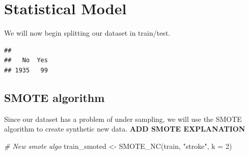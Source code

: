 \documentclass[
]{article}
\newenvironment{Shaded}{\begin{snugshade}}{\end{snugshade}}
\newcommand{\AttributeTok}[1]{\textcolor[rgb]{0.77,0.63,0.00}{#1}}
\newcommand{\CommentTok}[1]{\textcolor[rgb]{0.56,0.35,0.01}{\textit{#1}}}
\newcommand{\DecValTok}[1]{\textcolor[rgb]{0.00,0.00,0.81}{#1}}
\newcommand{\FloatTok}[1]{\textcolor[rgb]{0.00,0.00,0.81}{#1}}
\newcommand{\FunctionTok}[1]{\textcolor[rgb]{0.00,0.00,0.00}{#1}}
\newcommand{\NormalTok}[1]{#1}
\newcommand{\OtherTok}[1]{\textcolor[rgb]{0.56,0.35,0.01}{#1}}
\newcommand{\SpecialCharTok}[1]{\textcolor[rgb]{0.00,0.00,0.00}{#1}}
\newcommand{\StringTok}[1]{\textcolor[rgb]{0.31,0.60,0.02}{#1}}
\begin{document}
\section{Statistical Model}

We will now begin splitting our dataset in train/test.\\

\begin{Shaded}
\end{Shaded}

\begin{verbatim}
## 
##   No  Yes 
## 1935   99
\end{verbatim}

\subsection{SMOTE algorithm}

Since our dataset has a problem of under sampling, we will use the SMOTE
algorithm to create synthetic new data. \textbf{ADD SMOTE EXPLANATION}\\

\begin{Shaded}
\begin{Highlighting}[]
\CommentTok{\# New smote algo}
\NormalTok{train\_smoted }\OtherTok{\textless{}{-}} \FunctionTok{SMOTE\_NC}\NormalTok{(train, }\StringTok{"stroke"}\NormalTok{, }\AttributeTok{k =} \DecValTok{2}\NormalTok{)}
\end{Highlighting}
\end{Shaded}
\end{document}

